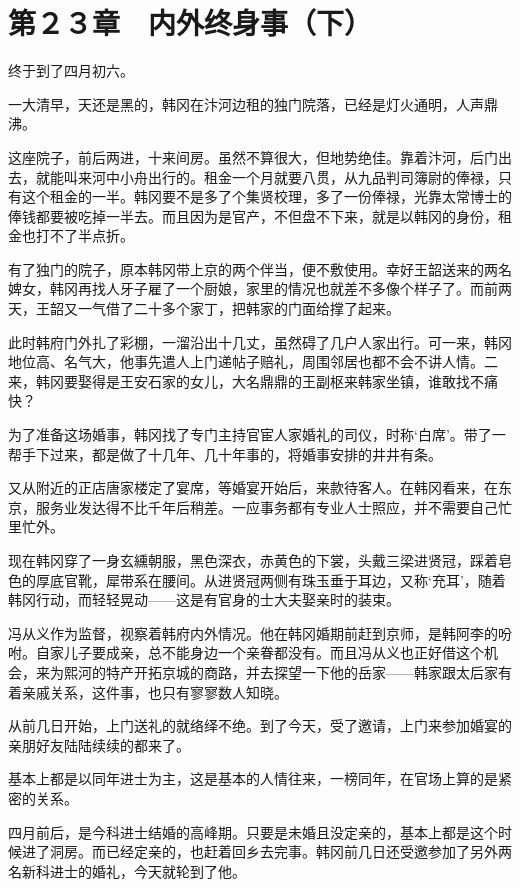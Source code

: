 \section{第２３章　内外终身事（下）}

终于到了四月初六。

一大清早，天还是黑的，韩冈在汴河边租的独门院落，已经是灯火通明，人声鼎沸。

这座院子，前后两进，十来间房。虽然不算很大，但地势绝佳。靠着汴河，后门出去，就能叫来河中小舟出行的。租金一个月就要八贯，从九品判司簿尉的俸禄，只有这个租金的一半。韩冈要不是多了个集贤校理，多了一份俸禄，光靠太常博士的俸钱都要被吃掉一半去。而且因为是官产，不但盘不下来，就是以韩冈的身份，租金也打不了半点折。

有了独门的院子，原本韩冈带上京的两个伴当，便不敷使用。幸好王韶送来的两名婢女，韩冈再找人牙子雇了一个厨娘，家里的情况也就差不多像个样子了。而前两天，王韶又一气借了二十多个家丁，把韩家的门面给撑了起来。

此时韩府门外扎了彩棚，一溜沿出十几丈，虽然碍了几户人家出行。可一来，韩冈地位高、名气大，他事先遣人上门递帖子赔礼，周围邻居也都不会不讲人情。二来，韩冈要娶得是王安石家的女儿，大名鼎鼎的王副枢来韩家坐镇，谁敢找不痛快？

为了准备这场婚事，韩冈找了专门主持官宦人家婚礼的司仪，时称‘白席’。带了一帮手下过来，都是做了十几年、几十年事的，将婚事安排的井井有条。

又从附近的正店唐家楼定了宴席，等婚宴开始后，来款待客人。在韩冈看来，在东京，服务业发达得不比千年后稍差。一应事务都有专业人士照应，并不需要自己忙里忙外。

现在韩冈穿了一身玄纁朝服，黑色深衣，赤黄色的下裳，头戴三梁进贤冠，踩着皂色的厚底官靴，犀带系在腰间。从进贤冠两侧有珠玉垂于耳边，又称‘充耳’，随着韩冈行动，而轻轻晃动——这是有官身的士大夫娶亲时的装束。

冯从义作为监督，视察着韩府内外情况。他在韩冈婚期前赶到京师，是韩阿李的吩咐。自家儿子要成亲，总不能身边一个亲眷都没有。而且冯从义也正好借这个机会，来为熙河的特产开拓京城的商路，并去探望一下他的岳家——韩家跟太后家有着亲戚关系，这件事，也只有寥寥数人知晓。

从前几日开始，上门送礼的就络绎不绝。到了今天，受了邀请，上门来参加婚宴的亲朋好友陆陆续续的都来了。

基本上都是以同年进士为主，这是基本的人情往来，一榜同年，在官场上算的是紧密的关系。

四月前后，是今科进士结婚的高峰期。只要是未婚且没定亲的，基本上都是这个时候进了洞房。而已经定亲的，也赶着回乡去完事。韩冈前几日还受邀参加了另外两名新科进士的婚礼，今天就轮到了他。

